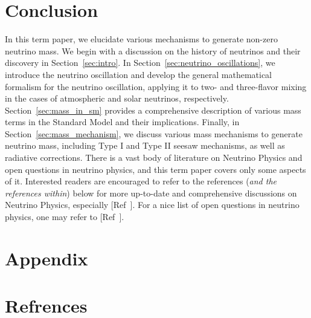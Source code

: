 \documentclass[jcp,aip,reprint,notitlepage,floatfix,superscriptaddress,twocolumn,superscriptaddress,eqsecnum]{revtex4-2}
\begin{document}
\section{Conclusion}
In this term paper, we elucidate various mechanisms to generate non-zero neutrino mass. We begin with a discussion on the history of neutrinos and their discovery in Section~\ref{sec:intro}. In Section~\ref{sec:neutrino_oscillations}, we introduce the neutrino oscillation and develop the general mathematical formalism for the neutrino oscillation, applying it to two- and three-flavor mixing in the cases of atmospheric and solar neutrinos, respectively. Section~\ref{sec:mass_in_sm} provides a comprehensive description of various mass terms in the Standard Model and their implications. Finally, in Section~\ref{sec:mass_mechanism}, we discuss various mass mechanisms to generate neutrino mass, including Type I and Type II seesaw mechanisms, as well as radiative corrections. There is a vast body of literature on Neutrino Physics and open questions in neutrino physics, and this term paper covers only some aspects of it. Interested readers are encouraged to refer to the references (\textit{and the references within}) below for more up-to-date and comprehensive discussions on Neutrino Physics, especially [Ref~]. For a nice list of open questions in neutrino physics, one may refer to [Ref~]. 


\section*{Appendix}
\appendix

\section*{Refrences}
\end{document}
